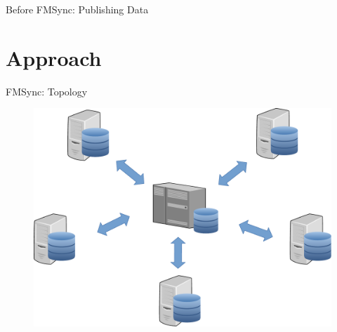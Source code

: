 \documentclass[xcolor=x11names, aspectratio=169,usenames,dvipsnames]{beamer}
\begin{document}
\begin{frame}{Before FMSync: Publishing Data}
\begin{figure}
\end{figure}
\end{frame}

\section{Approach}

\begin{frame}{FMSync: Topology}
\begin{figure}
	\includegraphics[height=.8\textheight]{img/topo.pdf}
\end{figure}
\end{frame}
\end{document}
